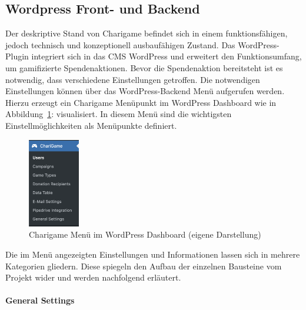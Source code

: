 \subsection{Wordpress Front- und Backend}
\label{subsec:front-backend}
Der deskriptive Stand von Charigame befindet sich in einem funktionsfähigen, jedoch technisch und konzeptionell ausbaufähigen Zustand.
Das WordPress-Plugin integriert sich in das CMS WordPress und erweitert den Funktionsumfang, um gamifizierte Spendenaktionen.
Bevor die Spendenaktion bereitsteht ist es notwendig, dass verschiedene Einstellungen getroffen.
Die notwendigen Einstellungen können über das WordPress-Backend Menü aufgerufen werden.
\\
Hierzu erzeugt ein Charigame Menüpunkt im WordPress Dashboard wie in Abbildung~\ref{fig:charigame-menu-legacy}: visualisiert.
In diesem Menü sind die wichtigsten Einstellmöglichkeiten als Menüpunkte definiert.
\begin{figure}[tbh]
    \centering
    \includegraphics[width=0.2\textwidth]{images/legacy_charigame_wordpress_menu}
    \caption{Charigame Menü im WordPress Dashboard (eigene Darstellung)}
    \label{fig:charigame-menu-legacy}
\end{figure}

Die im Menü angezeigten Einstellungen und Informationen lassen sich in mehrere Kategorien gliedern.
Diese spiegeln den Aufbau der einzelnen Bausteine vom Projekt wider und werden nachfolgend erläutert.
\\\\
\textbf{General Settings}

